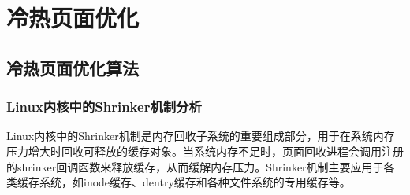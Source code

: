 





\section{冷热页面优化}

\subsection{冷热页面优化算法}

\subsubsection{Linux内核中的Shrinker机制分析}

Linux内核中的Shrinker机制是内存回收子系统的重要组成部分，用于在系统内存压力增大时回收可释放的缓存对象。当系统内存不足时，页面回收进程会调用注册的shrinker回调函数来释放缓存，从而缓解内存压力。Shrinker机制主要应用于各类缓存系统，如inode缓存、dentry缓存和各种文件系统的专用缓存等。

